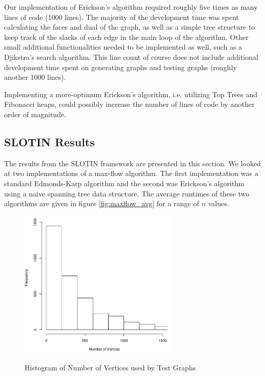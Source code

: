 \documentclass[12pt]{article}
\begin{document}
Our implementation of Erickson's algorithm required roughly five times as many lines of code (1000 lines).  The majority of the development time was spent calculating the faces and dual of the graph, as well as a simple tree structure to keep track of the slacks of each edge in the main loop of the algorithm.  Other small additional functionalities needed to be implemented as well, such as a Djikstra's search algorithm.  This line count of course does not include additional development time spent on generating graphs and testing graphs (roughly another 1000 lines).

Implementing a more-optimum Erickson's algorithm, i.e. utilizing Top Trees and Fibonacci heaps, could possibly increase the number of lines of code by another order of magnitude.

\subsection{SLOTIN Results}

The results from the SLOTIN framework are presented in this section. We looked at two implementations of a max-flow algorithm. The first implementation was a standard Edmonds-Karp algorithm and the second was Erickson's algorithm using a naive spanning tree data structure. The average runtimes of these two algorithms are given in figure \ref{fig:maxflow_avg} for a range of $n$ values. 

\begin{figure}[h!]
\caption{Histogram of Number of Vertices used by Test Graphs}
\centering
\includegraphics[width=3in]{num_vertices_histogram.png}
\label{fig:vertices-histogram}
\end{figure}
\end{document}
